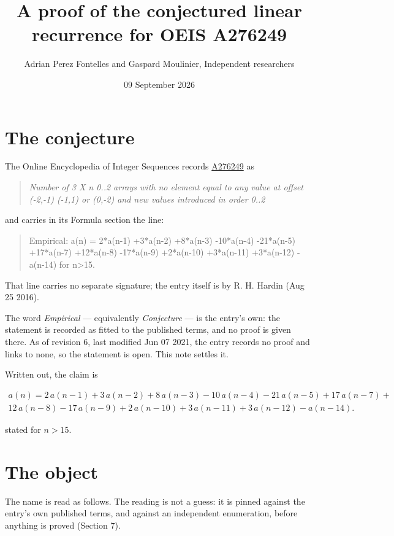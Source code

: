 \documentclass[11pt]{article}
\title{A proof of the conjectured linear recurrence for OEIS A276249}
\author{Adrian Perez Fontelles and Gaspard Moulinier, Independent researchers}
\date{09 September 2026}
\theoremstyle{definition}
\begin{document}
\maketitle
\section{The conjecture}

The Online Encyclopedia of Integer Sequences records \href{https://oeis.org/A276249}{A276249} as

\begin{quote}\itshape Number of 3 X n 0..2 arrays with no element equal to any value at offset (-2,-1) (-1,1) or (0,-2) and new values introduced in order 0..2\end{quote}

and carries in its Formula section the line:

\begin{quote}\ttfamily Empirical: a(n) = 2*a(n-1) +3*a(n-2) +8*a(n-3) -10*a(n-4) -21*a(n-5) +17*a(n-7) +12*a(n-8) -17*a(n-9) +2*a(n-10) +3*a(n-11) +3*a(n-12) -a(n-14) for n>15.\end{quote}

That line carries no separate signature; the entry itself is by R. H. Hardin (Aug 25 2016).

The word {\itshape Empirical} --- equivalently {\itshape Conjecture} --- is the entry's own: the statement is recorded as fitted to the published terms, and no proof is given there. As of revision 6, last modified Jun 07 2021, the entry records no proof and links to none, so the statement is open. This note settles it.

Written out, the claim is

\begin{multline*} a(n) = 2\,a(n-1) + 3\,a(n-2) + 8\,a(n-3) - 10\,a(n-4) - 21\,a(n-5) + 17\,a(n-7) + \\ 12\,a(n-8) - 17\,a(n-9) + 2\,a(n-10) + 3\,a(n-11) + 3\,a(n-12) - a(n-14). \end{multline*}

stated for $n > 15$.

\section{The object}

The name is read as follows. The reading is not a guess: it is pinned against the entry's own published terms, and against an independent enumeration, before anything is proved (Section 7).
\end{document}
